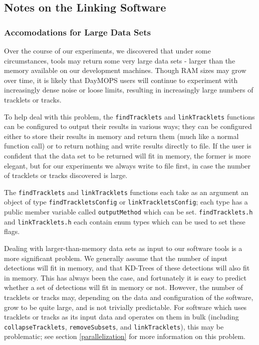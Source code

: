 \subsection{Notes on the Linking Software}

\subsubsection{Accomodations for Large Data Sets}
\label{largeData}
Over the course of our experiments, we discovered that under some
circumstances, tools may return some very large data sets - larger
than the memory available on our development machines.  Though RAM
sizes may grow over time, it is likely that DayMOPS users will
continue to experiment with increasingly dense noise or loose limits,
resulting in increasingly large numbers of tracklets or tracks.

To help deal with this problem, the {\tt  findTracklets} and
{\tt linkTracklets} functions can be configured to output their results
in various ways; they can be configured either to store their results
in memory and return them (much like a normal function call) or to
return nothing and write results directly to file.  If the user is
confident that the data set to be returned will fit in memory, the
former is more elegant, but for our experiments we always write to
file first, in case the number of tracklets or tracks discovered is
large.

The {\tt findTracklets} and {\tt linkTracklets} functions each take as
an argument an object of type {\tt findTrackletsConfig} or
{\tt linkTrackletsConfig}; each type has a public member variable
called {\tt outputMethod} which can be set.  {\tt findTracklets.h} and
{\tt linkTracklets.h} each contain enum types which can be used to set
these flags.

Dealing with larger-than-memory data sets as input to our software
tools is a more significant problem.  We generally assume that the
number of input detections will fit in memory, and that KD-Trees of
these detections will also fit in memory.  This has always been the
case, and fortunately it is easy to predict whether a set of
detections will fit in memory or not.  However, the number of
tracklets or tracks may, depending on the data and configuration of
the software, grow to be quite large, and is not trivially
predictable.  For software which uses tracklets or tracks as its input
data and operates on them in bulk (including {\tt collapseTracklets},
{\tt removeSubsets}, and {\tt linkTracklets}), this may be problematic;
see section \ref{parallelization} for more information on this
problem.





